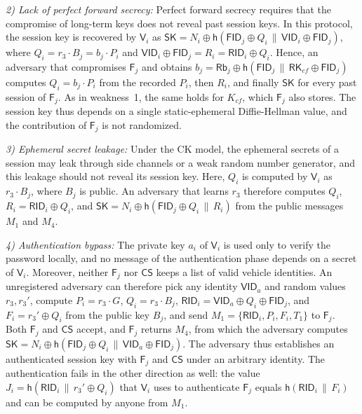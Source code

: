 \documentclass[journal]{IEEEtran}
\theoremstyle{plain}
\theoremstyle{definition}
\newcommand{\Veh}{\mathsf{V}}            %
\newcommand{\Fog}{\mathsf{F}}            %
\newcommand{\CS}{\mathsf{CS}}            %
\newcommand{\SK}{\mathsf{SK}}            %
\newcommand{\VID}{\mathsf{VID}}          %
\newcommand{\FID}{\mathsf{FID}}          %
\newcommand{\RID}{\mathsf{RID}}
\newcommand{\Rb}{\mathsf{Rb}}
\newcommand{\RK}{\mathsf{RK}}
\newcommand{\h}{\mathsf{h}}              %
\newcommand{\cat}{\,\|\,}               %
\begin{document}
\emph{2) Lack of perfect forward secrecy:} Perfect forward secrecy requires that the compromise of long-term keys does not reveal past session keys. In this protocol, the session key is recovered by $\Veh_i$ as $\SK=N_i\oplus\h(\FID_j\oplus Q_i\cat\VID_i\oplus\FID_j)$, where $Q_i=r_3\cdot B_j=b_j\cdot P_i$ and $\VID_i\oplus\FID_j=R_i=\RID_i\oplus Q_i$. Hence, an adversary that compromises $\Fog_j$ and obtains $b_j=\Rb_j\oplus\h(\FID_j\cat\RK_{cf}\oplus\FID_j)$ computes $Q_i=b_j\cdot P_i$ from the recorded $P_i$, then $R_i$, and finally $\SK$ for every past session of $\Fog_j$. As in weakness~1, the same holds for $K_{cf}$, which $\Fog_j$ also stores. The session key thus depends on a single static-ephemeral Diffie-Hellman value, and the contribution of $\Fog_j$ is not randomized.

\emph{3) Ephemeral secret leakage:} Under the CK model, the ephemeral secrets of a session may leak through side channels or a weak random number generator, and this leakage should not reveal its session key. Here, $Q_i$ is computed by $\Veh_i$ as $r_3\cdot B_j$, where $B_j$ is public. An adversary that learns $r_3$ therefore computes $Q_i$, $R_i=\RID_i\oplus Q_i$, and $\SK=N_i\oplus\h(\FID_j\oplus Q_i\cat R_i)$ from the public messages $M_1$ and $M_4$.

\emph{4) Authentication bypass:} The private key $a_i$ of $\Veh_i$ is used only to verify the password locally, and no message of the authentication phase depends on a secret of $\Veh_i$. Moreover, neither $\Fog_j$ nor $\CS$ keeps a list of valid vehicle identities. An unregistered adversary can therefore pick any identity $\VID_a$ and random values $r_3,r_3'$, compute $P_i=r_3\cdot G$, $Q_i=r_3\cdot B_j$, $\RID_i=\VID_a\oplus Q_i\oplus\FID_j$, and $F_i=r_3'\oplus Q_i$ from the public key $B_j$, and send $M_1=\{\RID_i,P_i,F_i,T_1\}$ to $\Fog_j$. Both $\Fog_j$ and $\CS$ accept, and $\Fog_j$ returns $M_4$, from which the adversary computes $\SK=N_i\oplus\h(\FID_j\oplus Q_i\cat\VID_a\oplus\FID_j)$. The adversary thus establishes an authenticated session key with $\Fog_j$ and $\CS$ under an arbitrary identity. The authentication fails in the other direction as well: the value $J_i=\h(\RID_i\cat r_3'\oplus Q_i)$ that $\Veh_i$ uses to authenticate $\Fog_j$ equals $\h(\RID_i\cat F_i)$ and can be computed by anyone from $M_1$.
\end{document}
